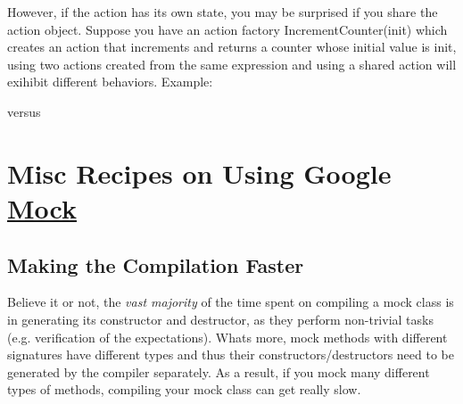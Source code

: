 \begin{DoxyCode}{0}
\end{DoxyCode}


However, if the action has its own state, you may be surprised if you share the action object. Suppose you have an action factory {\ttfamily Increment\+Counter(init)} which creates an action that increments and returns a counter whose initial value is {\ttfamily init}, using two actions created from the same expression and using a shared action will exihibit different behaviors. Example\+:


\begin{DoxyCode}{0}
\end{DoxyCode}


versus


\begin{DoxyCode}{0}
\DoxyCodeLine{}
\end{DoxyCode}


\section*{Misc Recipes on Using Google \mbox{\hyperlink{class_mock}{Mock}}}

\subsection*{Making the Compilation Faster}

Believe it or not, the {\itshape vast majority} of the time spent on compiling a mock class is in generating its constructor and destructor, as they perform non-\/trivial tasks (e.\+g. verification of the expectations). What\textquotesingle{}s more, mock methods with different signatures have different types and thus their constructors/destructors need to be generated by the compiler separately. As a result, if you mock many different types of methods, compiling your mock class can get really slow.

